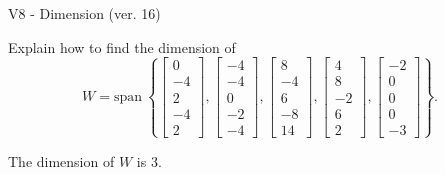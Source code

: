 \begin{exercise}
  \begin{exerciseTitle}V8 - Dimension (ver. 16)\end{exerciseTitle}
  \begin{exerciseStatement}
    Explain how to find the dimension of 
\[W=\mathrm{span}\ \left\{\left[\begin{array}{r}
0 \\
-4 \\
2 \\
-4 \\
2
\end{array}\right] , \left[\begin{array}{r}
-4 \\
-4 \\
0 \\
-2 \\
-4
\end{array}\right] , \left[\begin{array}{r}
8 \\
-4 \\
6 \\
-8 \\
14
\end{array}\right] , \left[\begin{array}{r}
4 \\
8 \\
-2 \\
6 \\
2
\end{array}\right] , \left[\begin{array}{r}
-2 \\
0 \\
0 \\
0 \\
-3
\end{array}\right]\right\}.\]



  \end{exerciseStatement}
  \begin{exerciseAnswer}
   The dimension of \(W\) is  \(3\).
  


  \end{exerciseAnswer}
\end{exercise}